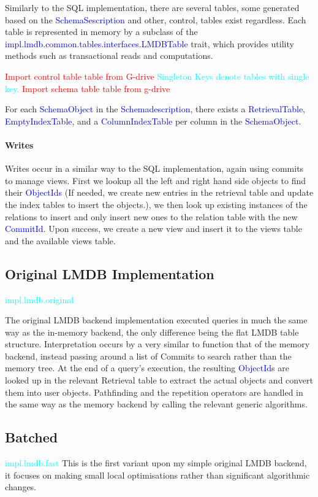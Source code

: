 \documentclass[12pt,a4paper,twoside,openright]{report}
\newcommand\todo[1]{\textcolor{red}{#1}}
\newcommand\codeName[1]{\textcolor{blue}{#1}}
\newcommand\note[1]{\textcolor{cyan}{#1}}
\begin{document}
 Similarly to the SQL implementation, there are several tables, some generated based on the \codeName{SchemaSescription} and other, control, tables exist regardless. Each table is represented in memory by a subclass of the \codeName{impl.lmdb.common.tables.interfaces.LMDBTable} trait, which provides utility methods such as transactional reads and computations.
 
 \todo{Import control table table from G-drive}
 \note{Singleton Keys denote tables with single key.}
 \todo{Import schema table table from g-drive}

For each \codeName{SchemaObject} in the \codeName{Schemadescription}, there exists a \codeName{RetrievalTable}, \codeName{EmptyIndexTable}, and a \codeName{ColumnIndexTable} per column in the \codeName{SchemaObject}.
		
		
		\paragraph{Writes}
		Writes occur in a similar way to the SQL implementation, again using commits to manage views. First we lookup all the left and right hand side objects to find their \codeName{ObjectIds} (If needed, we create new entries in the retrieval table and update the index tables to insert the objects.), we then look up existing instances of the relations to insert and only insert new ones to the relation table with the new \codeName{CommitId}. Upon success, we create a new view and insert it to the views table and the available views table.

	\subsection{Original LMDB Implementation}
	\note{impl.lmdb.original}

The original LMDB backend implementation executed queries in much the same way as the in-memory backend, the only difference being the flat LMDB table structure. Interpretation occurs by a very similar to function that of the memory backend, instead passing around a list of Commits to search rather than the memory tree. At the end of a query’s execution, the resulting \codeName{ObjectId}s are looked up in the relevant Retrieval table to extract the actual objects and convert them into user objects. Pathfinding and the repetition operators are handled in the same way as the memory backend by calling the relevant generic algorithms.
 

	\subsection{Batched}
	\note{impl.lmdb.fast}
	This is the first variant upon my simple original LMDB backend, it focuses on making small local optimisations rather than significant algorithmic changes.
	
\end{document}
